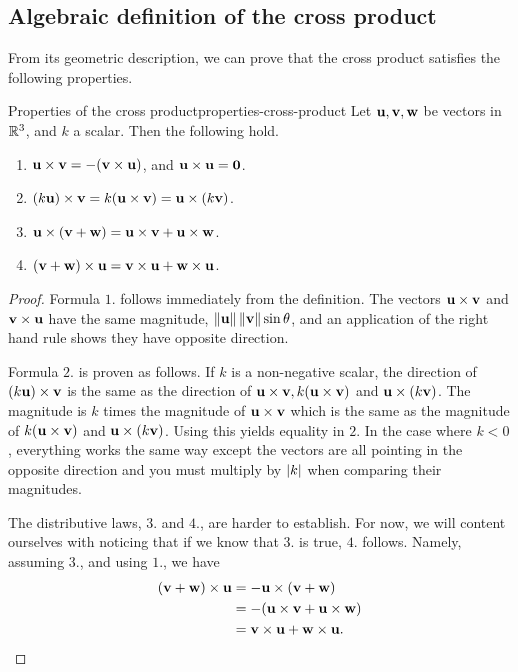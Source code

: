 \subsection{Algebraic definition of the cross product}

From its geometric description, we can prove that the cross product
satisfies the following properties.

\begin{proposition}{Properties of the cross product}{properties-cross-product}
  Let $\vect{u}, \vect{v}, \vect{w}$ be vectors in $\mathbb{R}^3$, and $k$ a
  scalar. Then the following hold.%
  \begin{enumerate}
  \item
    $\vect{u}\times \vect{v}= -(\vect{v}\times \vect{u})$,
    and $\vect{u}\times \vect{u}=\vect{0}$.
  \item $(k \vect{u})\times \vect{v}= k (\vect{u}\times \vect{v})
    =\vect{u}\times (k \vect{v})$.
  \item $\vect{u}\times (\vect{v}+\vect{w}) =\vect{u}\times \vect{v}+\vect{u}\times \vect{w}$.
  \item $(\vect{v}+\vect{w}) \times \vect{u}=\vect{v} \times \vect{u}+\vect{w}\times \vect{u}$.
  \end{enumerate}
\end{proposition}

\begin{proof}
  Formula $1$. follows immediately from the definition. The vectors
  $\vect{u}\times \vect{v}$ and $\vect{v}\times \vect{u}$ have the
  same magnitude, $\norm{\vect{u}}\norm{\vect{v}}\sin \theta$, and an
  application of the right hand rule shows they have opposite
  direction.

  Formula $2$. is proven as follows. If $k$ is a non-negative scalar,
  the direction of $(k \vect{u}) \times \vect{v}$ is the same as
  the direction of
  $\vect{u}\times \vect{v}, k (\vect{u}\times \vect{v})$ and
  $\vect{u}\times (k \vect{v})$. The magnitude is $k$ times the
  magnitude of $\vect{u}\times \vect{v}$ which is the same as the
  magnitude of $k (\vect{u}\times \vect{v})$ and
  $\vect{u}\times (k \vect{v})$. Using this yields equality in
  $2$. In the case where $k <0$, everything works the same way except
  the vectors are all pointing in the opposite direction and you must
  multiply by $\left|k\right|$ when comparing their magnitudes.

  The distributive laws, $3$. and $4$., are harder to establish. For
  now, we will content ourselves with noticing that if we know that
  $3$. is true, $4$. follows. Namely, assuming $3$., and using $1$.,
  we have
  \begin{align*}
    (\vect{v}+\vect{w}) \times \vect{u}
    & =-\vect{u}\times (
      \vect{v}+\vect{w}) \\
    & =-(\vect{u}\times \vect{v}+\vect{u}\times \vect{w}) \\
    & =\vect{v}\times \vect{u}+\vect{w}\times \vect{u}.
  \end{align*}
\end{proof}

